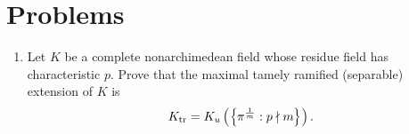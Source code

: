 \section{Problems}
\begin{enumerate}
\item
Let $K$ be a complete nonarchimedean field whose residue field has characteristic $p$. Prove that the maximal tamely ramified (separable) extension of $K$ is
\[
K_{\text{tr}}=K_u\left( {\left\{{\pi^{\frac{1}{m}}}:{p\nmid m}\right\}} \right).
\]
\end{enumerate}
